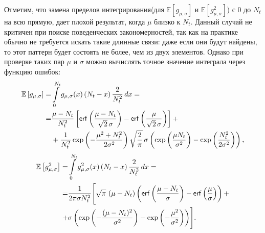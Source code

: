 \documentclass[12pt,fсeqn]{article}
\begin{document}
Отметим, что замена пределов интегрирования(для $\mathbb{E} \left[ g_{\mu,\sigma} \right]$ и
$\mathbb{E} \left[ g^2_{\mu,\sigma} \right]$) с 0 до $N_t$ на всю прямую, дает плохой результат, когда
$\mu$ близко к $N_t$. Данный случай не критичен при поиске поведенческих закономерностей, так как на практике 
обычно не требуется искать такие длинные связи:
даже если они будут найдены, то этот паттерн будет состоять не более, чем из двух элементов. 
Однако при проверке таких пар $\mu$ и $\sigma$ можно вычислять точное значение интеграла через функцию ошибок:
$$
\begin{aligned}
\mathbb{E} \left[ g_{\mu,\sigma} \right] =& \int\limits_{0}^{N_t}g_{\mu,\sigma}(x)\,(N_t-x)\,\frac{2}{N_t^2}\,dx = \\
=& \frac{\mu-N_t}{N^2_t} \left[  \mathsf{erf}\left( \frac{\mu-N_t}{\sqrt{2}\,\sigma}\right) - \mathsf{erf}\left( \frac{\mu}{\sqrt{2}\,\sigma}\right)  \right] +\\
&+\frac1{N_t^2}\exp\left(-\frac{\mu^2+N_t^2}{2\sigma^2}\right)\sqrt{\frac2\pi}\,\sigma\left( 
\exp\left(\frac{\mu N_t}{\sigma^2}\right)-\exp\left(\frac{N^2_t}{2\sigma^2}\right)
\right),
\end{aligned}
$$
$$
\begin{aligned}
\mathbb{E} \left[ g^2_{\mu,\sigma} \right] =& \int\limits_{0}^{N_t}g^2_{\mu,\sigma}(x)\,(N_t-x)\,\frac{2}{N_t^2}\,dx = \\
=& \frac1{2\pi\sigma N^2_t} 
\Biggl[  
\sqrt\pi\,\left( \mu-N_t \right) \left( 
\mathsf{erf}\left( \frac{\mu-N_t}{\sigma}\right) - \mathsf{erf}\left( \frac\mu\sigma\right)  \right) +\\
+& \sigma \left( 
\exp\left(-\frac{(\mu-N_t)^2}{\sigma^2}\right) - \exp\left(-\frac{\mu^2}{\sigma^2}\right)
\right)
\Biggr].
\end{aligned}
$$
\end{document}
